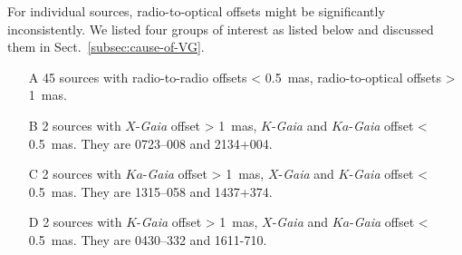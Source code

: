 \documentclass{aa-note}   %
\begin{document}
For individual sources, radio-to-optical offsets might be significantly inconsistently.
We listed four groups of interest as listed below and discussed them in Sect.~\ref{subsec:cause-of-VG}.
%
\begin{enumerate}
    \item[A] 45 sources with radio-to-radio offsets < 0.5~mas, radio-to-optical offsets > 1~mas.
    \item[B] 2 sources with $X$-\textit{Gaia} offset > 1~mas, $K$-\textit{Gaia} and $Ka$-\textit{Gaia} offset < 0.5~mas.
    They are 0723--008 and 2134+004.
    \item[C] 2 sources with $Ka$-\textit{Gaia} offset > 1~mas, $X$-\textit{Gaia} and $K$-\textit{Gaia} offset < 0.5~mas.
    They are 1315--058 and 1437+374.
    \item[D] 2 sources with $K$-\textit{Gaia} offset > 1~mas, $X$-\textit{Gaia} and $Ka$-\textit{Gaia} offset < 0.5~mas.
    They are 0430--332 and 1611-710.
\end{enumerate}
%
\end{document}
